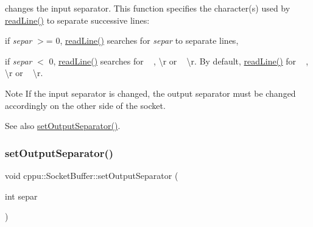 changes the input separator. This function specifies the character(s) used by \mbox{\hyperlink{classcppu_1_1_socket_buffer_a222769d3776b9cbd3a727ee1f0e60358}{read\+Line()}} to separate successive lines\+: 


\begin{DoxyItemize}
\item if {\itshape separ} $>$= 0, \mbox{\hyperlink{classcppu_1_1_socket_buffer_a222769d3776b9cbd3a727ee1f0e60358}{read\+Line()}} searches for {\itshape separ} to separate lines,
\item if {\itshape separ} $<$ 0, \mbox{\hyperlink{classcppu_1_1_socket_buffer_a222769d3776b9cbd3a727ee1f0e60358}{read\+Line()}} searches for ~\newline
, \textbackslash{}r or ~\newline
\textbackslash{}r. By default, \mbox{\hyperlink{classcppu_1_1_socket_buffer_a222769d3776b9cbd3a727ee1f0e60358}{read\+Line()}} for ~\newline
, \textbackslash{}r or ~\newline
\textbackslash{}r. \begin{DoxyNote}{Note}
If the input separator is changed, the output separator must be changed accordingly on the other side of the socket. 
\end{DoxyNote}
\begin{DoxySeeAlso}{See also}
\mbox{\hyperlink{classcppu_1_1_socket_buffer_a0e5e6a9ce3bda28b65c559c8b3c91b0f}{set\+Output\+Separator()}}. 
\end{DoxySeeAlso}

\end{DoxyItemize}\mbox{\label{classcppu_1_1_socket_buffer_a0e5e6a9ce3bda28b65c559c8b3c91b0f}} 
\subsubsection{\texorpdfstring{setOutputSeparator()}{setOutputSeparator()}}
{\footnotesize\ttfamily void cppu\+::\+Socket\+Buffer\+::set\+Output\+Separator (\begin{DoxyParamCaption}\item[{int}]{separ }\end{DoxyParamCaption})\hspace{0.3cm}{\ttfamily [virtual]}}



